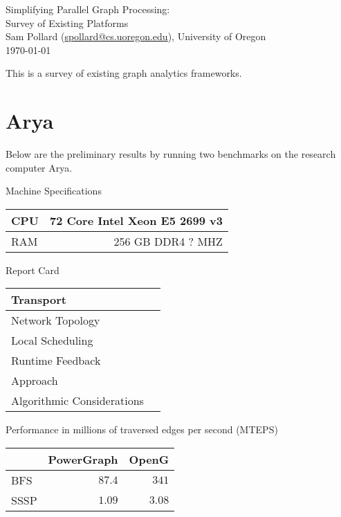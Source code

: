 \documentclass[11pt]{article}
\begin{document}
\begin{center}
{ \huge
	Simplifying Parallel Graph Processing: \\
}
{ \Large
	Survey of Existing Platforms \\
}
Sam Pollard (\href{mailto:spollard@cs.uoregon.edu}{spollard@cs.uoregon.edu}), University of Oregon \\
\today
\end{center}

This is a survey of existing graph analytics frameworks.

\section{Arya}
Below are the preliminary results by running two benchmarks on the research computer Arya.

Machine Specifications


\begin{tabular}{lr}
CPU & 72 Core Intel Xeon E5 2699 v3\\ \hline
RAM & 256 GB DDR4 ? MHZ
\end{tabular}

Report Card

\begin{tabular}{lr}
Transport & \\ \hline
Network Topology & \\ \hline
Local Scheduling & \\ \hline
Runtime Feedback & \\ \hline
Approach & \\ \hline
Algorithmic Considerations & \\ \hline
\end{tabular}

Performance in millions of traversed edges per second (MTEPS)

\begin{tabular}{l|r|r|}
 & PowerGraph & OpenG \\ \hline
BFS & $87.4$ & $341$ \\ \hline
SSSP & $1.09$ & $3.08$ \\ \hline
\end{tabular}
\end{document}
